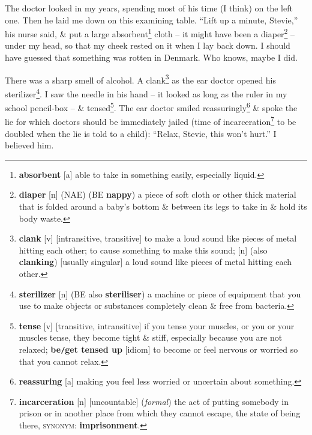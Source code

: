 \documentclass[oneside]{book}
\numberwithin{equation}{section}
\begin{document}
The doctor looked in my years, spending most of his time (I think) on the left one. Then he laid me down on this examining table. ``Lift up a minute, Stevie,'' his nurse said, \& put a large absorbent\footnote{\textbf{absorbent} [a] able to take in something easily, especially liquid.} cloth -- it might have been a diaper\footnote{\textbf{diaper} [n] (NAE) (BE \textbf{nappy}) a piece of soft cloth or other thick material that is folded around a baby's bottom \& between its legs to take in \& hold its body waste.} -- under my head, so that my cheek rested on it when I lay back down. I should have guessed that something was rotten in Denmark. Who knows, maybe I did.

There was a sharp smell of alcohol. A clank\footnote{\textbf{clank} [v] [intransitive, transitive] to make a loud sound like pieces of metal hitting each other; to cause something to make this sound; [n] (also \textbf{clanking}) [usually singular] a loud sound like pieces of metal hitting each other.} as the ear doctor opened his sterilizer\footnote{\textbf{sterilizer} [n] (BE also \textbf{steriliser}) a machine or piece of equipment that you use to make objects or substances completely clean \& free from bacteria.}. I saw the needle in his hand -- it looked as long as the ruler in my school pencil-box -- \& tensed\footnote{\textbf{tense} [v] [transitive, intransitive] if you tense your muscles, or you or your muscles tense, they become tight \& stiff, especially because you are not relaxed; \textbf{be\texttt{/}get tensed up} [idiom] to become or feel nervous or worried so that you cannot relax.}. The ear doctor smiled reassuringly\footnote{\textbf{reassuring} [a] making you feel less worried or uncertain about something.} \& spoke the lie for which doctors should be immediately jailed (time of incarceration\footnote{\textbf{incarceration} [n] [uncountable] (\textit{formal}) the act of putting somebody in prison or in another place from which they cannot escape, the state of being there, \textsc{synonym}: \textbf{imprisonment}.} to be doubled when the lie is told to a child): ``Relax, Stevie, this won't hurt.'' I believed him.
\end{document}

